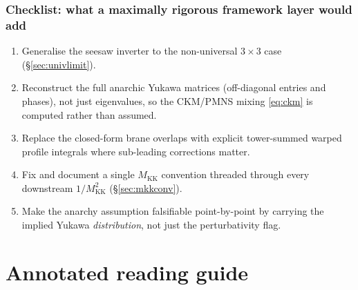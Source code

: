 \documentclass[11pt]{article}
\newcommand{\MKK}{M_{\mathrm{KK}}}
\theoremstyle{definition}
\begin{document}
\section{Checklist: what a maximally rigorous framework layer would add}
\begin{enumerate}[leftmargin=1.8em]
\item Generalise the seesaw inverter to the non-universal $3\times3$ case
(\S\ref{sec:univlimit}).
\item Reconstruct the full anarchic Yukawa matrices (off-diagonal entries and
phases), not just eigenvalues, so the CKM/PMNS mixing \eqref{eq:ckm} is computed
rather than assumed.
\item Replace the closed-form brane overlaps with explicit tower-summed warped
profile integrals where sub-leading corrections matter.
\item Fix and document a single $\MKK$ convention threaded through every
downstream $1/\MKK^2$ (\S\ref{sec:mkkconv}).
\item Make the anarchy assumption falsifiable point-by-point by carrying the
implied Yukawa \emph{distribution}, not just the perturbativity flag.
\end{enumerate}

\part*{Annotated reading guide}
\end{document}
